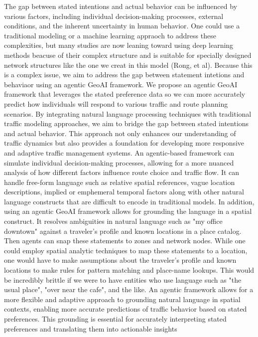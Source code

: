 \documentclass[11pt,letterpaper]{article}
\begin{document}
The gap between stated intentions and actual behavior can be influenced by various factors, including individual decision-making processes, 
external conditions, and the inherent uncertainty in human behavior. One could use a traditional modeling or a machine learning appraoch 
to address these complexities, but many studies are now leaning toward using deep learning methods beacuse of their complex structure and 
is suitable for specially designed network structures like the one we creat in this model (Rong, et al). Because this is a complex issue, 
we aim to address the gap between statement intetions and behaviaor using an agentic GeoAI framework. We propose an agentic GeoAI 
framework that leverages the stated preference data so we can more accurately predict how individuals will respond to various traffic and route planning scenarios. 
By integrating natural language processing techniques with traditional traffic modeling approaches, we aim to bridge the gap between stated intentions and 
actual behavior. This approach not only enhances our understanding of traffic dynamics but also provides a foundation for developing more responsive and 
adaptive traffic management systems. An agentic-based framework can simulate individual decision-making processes, allowing for a more nuanced analysis of 
how different factors influence route choice and traffic flow. It can handle free-form language such as relative spatial references, vague location descriptions, 
implied or emphemeral temporal factors along with other natural language constructs that are difficult to encode in traditional models. 
In addition, using an agentic GeoAI framework allows for grounding the language in a spatial construct. It resolves ambiguities in natural 
language such as "my office downtown" against a traveler's profile and known locations in a place catalog. Then agents can snap these 
statements to zones and network nodes. While one could employ spatial analytic techniques to map these statements to a location, one would have to 
make assumptions about the traveler's profile and known locations to make rules for pattern matching and place-name lookups. This would be 
incredibly brittle if we were to have entities who use language such as "the usual place", "over near the cafe", and the like. An agentic framework allows 
for a more flexible and adaptive approach to grounding natural language in spatial contexts, enabling more accurate predictions of traffic behavior 
based on stated preferences. This grounding is essential for accurately interpreting stated preferences and translating them into actionable insights 
\end{document}
